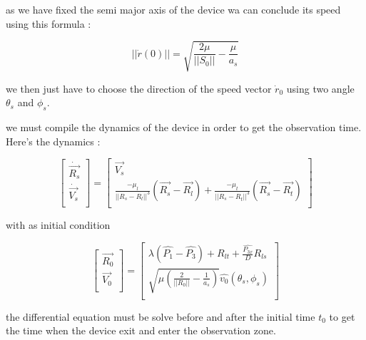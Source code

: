 \documentclass[11pt]{article} %
\begin{document}
		as we have fixed the semi major axis of the device wa can conclude its speed using this formula :
		
		$$
		||\dot{r}(0)||=\sqrt{\frac{2\mu}{||S_0||}-\frac{\mu}{a_s}}
		$$
		
		
		we then just have to choose the direction of the speed vector $\dot{r}_0$ using two angle $\theta_s$ and $\phi_s$.
		
		
		
		
		we must compile the dynamics of the device in order to get the observation time. Here's the dynamics : 
		
		$$
		\begin{bmatrix}
			\dot{\overrightarrow{R_{s}}}\\
			\dot{\overrightarrow{V_{s}}}\\
		\end{bmatrix} =\begin{bmatrix}
			\overrightarrow{V_{s}}\\
			\frac{-\mu_l }{||R_{s}-R_{l} ||^{3}}(\overrightarrow{R_{s}}-\overrightarrow{R_{l}}) + \frac{-\mu_t }{||R_{s}-R_{t} ||^{3}}(\overrightarrow{R_{s}}-\overrightarrow{R_{t}})\\
		\end{bmatrix}
		$$
		
		with as initial condition
		
		$$
		\begin{bmatrix}
			\overrightarrow{R_{0}}\\
			\overrightarrow{V_{0}}\\
		\end{bmatrix} =\begin{bmatrix}
			\lambda \left(\widehat{P_{1}} -\widehat{P_{3}}\right) +R_{lt} +\frac{\widehat{P_{3x}}}{D} R_{ls}\\
			\sqrt{\mu \left(\frac{2}{||R_{0} ||} -\frac{1}{a_s}\right)}\widehat{v_{0}}( \theta _{s} ,\phi _{s})\\
		\end{bmatrix}
		$$
		
		the differential equation must be solve before and after the initial time $t_0$ to get the time when the device exit and enter the observation zone.
		
\end{document}

